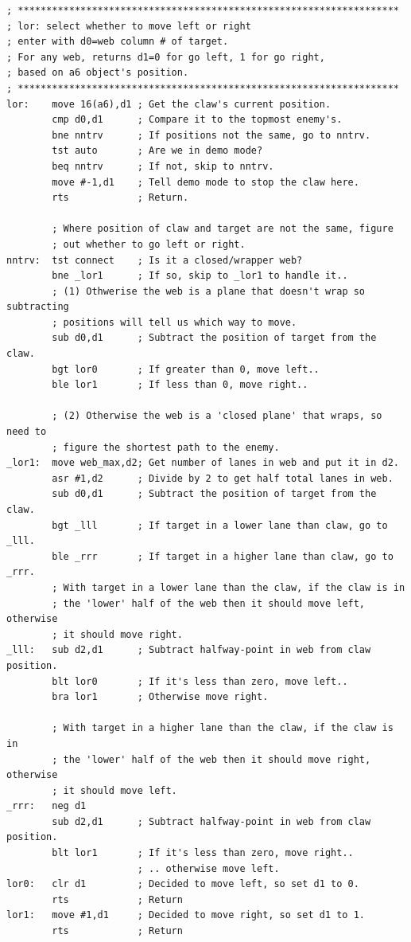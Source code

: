 \begin{lstlisting}
; *******************************************************************
; lor: select whether to move left or right
; enter with d0=web column # of target. 
; For any web, returns d1=0 for go left, 1 for go right,
; based on a6 object's position.
; *******************************************************************
lor:    move 16(a6),d1 ; Get the claw's current position.
        cmp d0,d1      ; Compare it to the topmost enemy's.
        bne nntrv      ; If positions not the same, go to nntrv.
        tst auto       ; Are we in demo mode?
        beq nntrv      ; If not, skip to nntrv.
        move #-1,d1    ; Tell demo mode to stop the claw here.
        rts            ; Return.

        ; Where position of claw and target are not the same, figure
        ; out whether to go left or right.
nntrv:  tst connect    ; Is it a closed/wrapper web?
        bne _lor1      ; If so, skip to _lor1 to handle it..
        ; (1) Othwerise the web is a plane that doesn't wrap so subtracting
        ; positions will tell us which way to move.
        sub d0,d1      ; Subtract the position of target from the claw. 
        bgt lor0       ; If greater than 0, move left..
        ble lor1       ; If less than 0, move right..

        ; (2) Otherwise the web is a 'closed plane' that wraps, so need to
        ; figure the shortest path to the enemy.
_lor1:  move web_max,d2; Get number of lanes in web and put it in d2.
        asr #1,d2      ; Divide by 2 to get half total lanes in web.
        sub d0,d1      ; Subtract the position of target from the claw. 
        bgt _lll       ; If target in a lower lane than claw, go to _lll.  
        ble _rrr       ; If target in a higher lane than claw, go to _rrr.  
        ; With target in a lower lane than the claw, if the claw is in 
        ; the 'lower' half of the web then it should move left, otherwise
        ; it should move right.
_lll:   sub d2,d1      ; Subtract halfway-point in web from claw position.
        blt lor0       ; If it's less than zero, move left..
        bra lor1       ; Otherwise move right.

        ; With target in a higher lane than the claw, if the claw is in 
        ; the 'lower' half of the web then it should move right, otherwise
        ; it should move left.
_rrr:   neg d1       
        sub d2,d1      ; Subtract halfway-point in web from claw position.
        blt lor1       ; If it's less than zero, move right..
                       ; .. otherwise move left.
lor0:   clr d1         ; Decided to move left, so set d1 to 0.
        rts            ; Return
lor1:   move #1,d1     ; Decided to move right, so set d1 to 1.
        rts            ; Return
\end{lstlisting}
\clearpage

